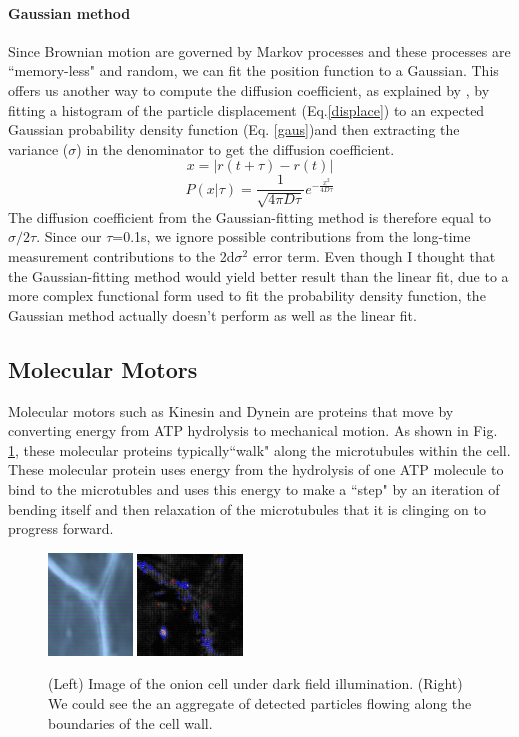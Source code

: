 \documentclass[iop,revtex4]{emulateapj_mod}
\begin{document}
\paragraph{Gaussian method} Since Brownian motion are governed by Markov processes and these processes are ``memory-less"  and random, we can fit the position function to a Gaussian. This offers us another way to compute the diffusion coefficient, as explained by \cite{grier}, by fitting a histogram of the particle displacement (Eq.\ref{displace}) to an expected Gaussian probability density function  (Eq. \ref{gaus})and then extracting the variance ($\sigma$) in the denominator to get the diffusion coefficient. 
\begin{equation}\label{displace}
x = | r(t+\tau)-r(t)|
\end{equation}
\begin{equation}
P(x|\tau) = \frac{1}{\sqrt{4\pi D \tau}} e^{-\frac{x^2}{4D\tau}}
\label{gaus}
\end{equation}
The diffusion coefficient from the Gaussian-fitting method is therefore equal to $\sigma/2\tau$. Since our $\tau$=0.1s, we ignore possible contributions from the long-time measurement contributions to the 2d$\sigma^2$ error term. Even though I thought that the Gaussian-fitting method would yield better result than the linear fit, due to a more complex functional form used to fit the probability density function, the Gaussian method actually doesn't perform as well as the linear fit.
\subsection{Molecular Motors}
\par Molecular motors such as Kinesin and Dynein are proteins that move by converting energy from ATP hydrolysis to mechanical motion. As shown in Fig. \ref{onion}, these molecular proteins typically``walk" along the microtubules within the cell. These molecular protein  uses energy from the hydrolysis of one ATP molecule to bind to the microtubles and uses this energy to make a ``step" by an iteration of bending itself and then relaxation of the microtubules that it is clinging on to progress forward. 
\begin{figure}[h]
\includegraphics[width=0.20\textwidth]{plots/onion.png}
\includegraphics[width=0.25\textwidth]{plots/onion2.png}
\caption{(Left) Image of the onion cell under dark field illumination. (Right) We could see the an aggregate of detected particles flowing along the boundaries of the cell wall.}
\label{onion}
\end{figure}
\end{document}
